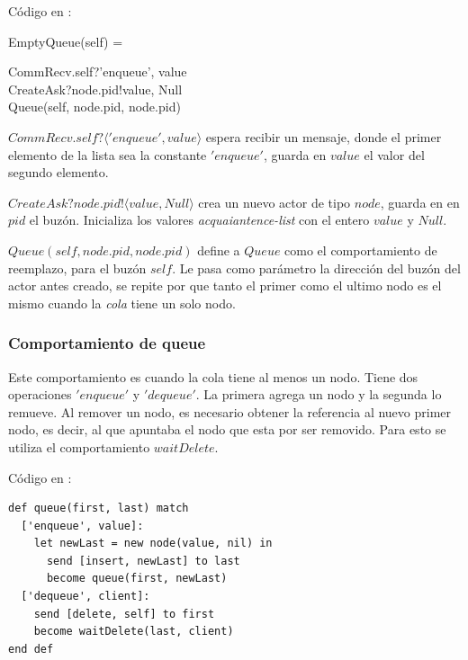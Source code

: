 Código en \CSP:

\begin{process}
EmptyQueue(self) = \\ \quad
  \begin{block}
  CommRecv.self?\langle 'enqueue', value \rangle \then \\ 
  CreateAsk?node.pid!\langle value, Null\rangle \then \\
  Queue(self, node.pid, node.pid)
  \end{block}
\end{process}

\begin{description}
 \item $CommRecv.self?\langle 'enqueue', value \rangle$ espera recibir un mensaje, donde el primer elemento de la lista sea la constante $'enqueue'$, guarda en $value$ el valor del segundo elemento.
 \item $CreateAsk?node.pid!\langle value, Null \rangle$ crea un nuevo actor de tipo $node$, guarda en en $pid$ el buzón. Inicializa los valores \textit{acquaiantence-list} con el entero $value$ y $Null$.
 \item $Queue(self, node.pid, node.pid)$ define a $Queue$ como el comportamiento de reemplazo, para el buzón $self$. Le pasa como parámetro la dirección del buzón del actor antes creado, se repite por que tanto el primer como el ultimo nodo es el mismo cuando la \textit{cola} tiene un solo nodo.
\end{description}

\subsubsection*{Comportamiento de queue}
Este comportamiento es cuando la cola tiene al menos un nodo. Tiene dos operaciones $'enqueue'$ y $'dequeue'$. La primera agrega un nodo y la segunda lo remueve. Al remover un nodo, es necesario obtener la referencia al nuevo primer nodo, es decir, al que apuntaba el nodo que esta por ser removido. Para esto se utiliza el comportamiento $waitDelete$.

Código en \SAL:

\begin{lstlisting}[language=sal, style=simple]
def queue(first, last) match 
  ['enqueue', value]: 
    let newLast = new node(value, nil) in
      send [insert, newLast] to last
      become queue(first, newLast)
  ['dequeue', client]: 
    send [delete, self] to first
    become waitDelete(last, client)
end def
\end{lstlisting}


